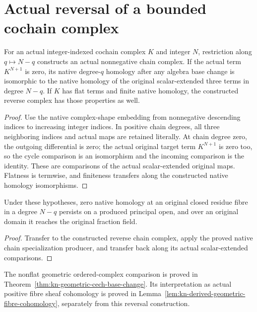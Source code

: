 \section{Actual reversal of a bounded cochain complex}

\begin{lemma}
\label{lem:kn-derived-cochain-reversal}
\leanok
For an actual integer-indexed cochain complex $K$ and integer $N$,
restriction along $q\mapsto N-q$ constructs an actual nonnegative
chain complex.  If the actual term $K^{N+1}$ is zero, its native
degree-$q$ homology after any algebra base change is isomorphic to
the native homology of the original scalar-extended three terms
in degree $N-q$.  If $K$ has flat terms and finite native homology,
the constructed reverse complex has those properties as well.
\end{lemma}
\begin{proof}
Use the native complex-shape embedding from nonnegative descending
indices to increasing integer indices.  In positive chain degrees,
all three neighboring indices and actual maps are retained literally.
At chain degree zero, the outgoing differential is zero; the actual
original target term $K^{N+1}$ is zero too, so the cycle comparison
is an isomorphism and the incoming comparison is the identity.
These are comparisons of the actual scalar-extended original maps.
Flatness is termwise, and finiteness transfers along the constructed
native homology isomorphisms.
\end{proof}

\begin{corollary}
\label{cor:kn-derived-cochain-homology-specialization}
\leanok
Under these hypotheses, zero native homology at an original closed
residue fibre in a degree $N-q$ persists on a produced principal open,
and over an original domain it reaches the original fraction field.
\end{corollary}
\begin{proof}
Transfer to the constructed reverse chain complex, apply the proved
native chain specialization producer, and transfer back along its
actual scalar-extended comparisons.
\end{proof}

\begin{remark}
The nonflat geometric ordered-complex comparison is proved in
Theorem~\ref{thm:kn-geometric-cech-base-change}.  Its interpretation
as actual positive fibre sheaf cohomology is proved in
Lemma~\ref{lem:kn-derived-geometric-fibre-cohomology}, separately
from this reversal construction.
\end{remark}

